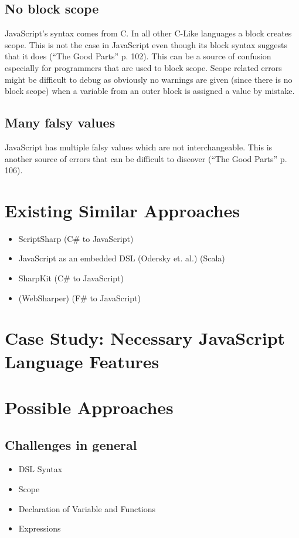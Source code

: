 	\subsection{No block scope}
		JavaScript’s syntax comes from C. In all other C-Like languages a block creates scope. This is not the case in JavaScript even though its block syntax suggests that it does (“The Good Parts” p. 102). This can be a source of confusion especially for programmers that are used to block scope. Scope related errors might be difficult to debug as obviously no warnings are given (since there is no block scope) when a variable from an outer block is assigned a value by mistake.

	\subsection{Many falsy values}
		JavaScript has multiple falsy values which are not interchangeable. This is another source of errors that can be difficult to discover (“The Good Parts” p. 106).

\section{Existing Similar Approaches}
	\begin{itemize}
		\item ScriptSharp (C\# to JavaScript)
		\item JavaScript as an embedded DSL (Odersky et. al.) (Scala)
		\item SharpKit (C\# to JavaScript)
		\item (WebSharper) (F\# to JavaScript)
	\end{itemize}

\section{Case Study: Necessary JavaScript Language Features}

\section{Possible Approaches}
	\subsection{Challenges in general}
		\begin{itemize}
			\item DSL Syntax
			\item Scope
			\item Declaration of Variable and Functions
			\item Expressions
		\end{itemize}

